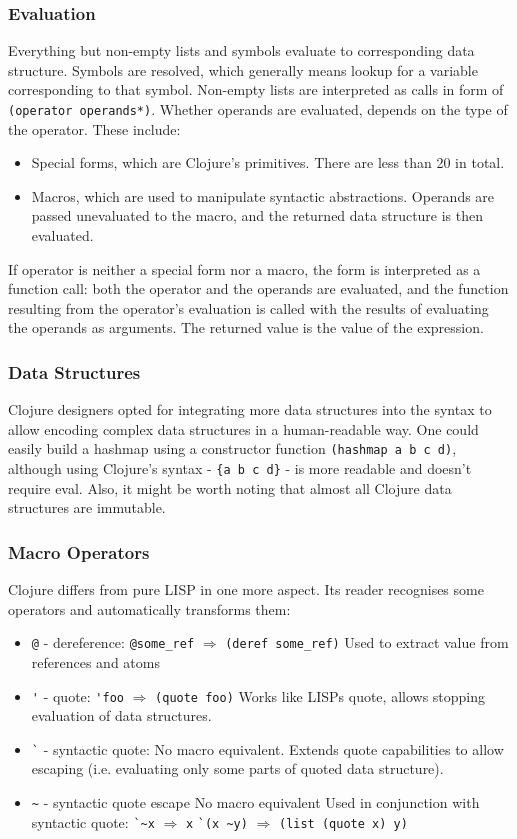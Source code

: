 \documentclass[11pt]{scrartcl}
\begin{document}
\subsubsection{Evaluation}
Everything but non-empty lists and symbols evaluate to corresponding data
structure.
Symbols are resolved, which generally means lookup for a variable corresponding
to that symbol.
Non-empty lists are interpreted as calls in form of \lstinline|(operator operands*)|.
Whether operands are evaluated, depends on the type of the operator.
These include:
\begin{itemize}
  \item Special forms, which are Clojure’s primitives. There are  less than 20
    in total.
  \item Macros, which are used to manipulate syntactic abstractions. Operands
    are passed unevaluated to the macro, and the returned data structure is then
    evaluated.
\end{itemize}
If operator is neither a special form nor a macro, the form is interpreted as a
function call: both the operator and the operands are evaluated, and the
function resulting from the operator’s evaluation is called with the results of
evaluating the operands as arguments.
The returned value is the value of the expression.

\subsubsection{Data Structures}
Clojure designers opted for integrating more data structures into the syntax to
allow encoding complex data structures in a human-readable way.
One could easily build a hashmap using a constructor function
\lstinline$(hashmap a b c d)$, although using Clojure’s syntax -
\lstinline${a b c d}$ - is more readable and doesn’t require eval.
Also, it might be worth noting that almost all Clojure data structures are
immutable.

\subsubsection{Macro Operators}
Clojure differs from pure LISP in one more aspect.
Its reader recognises some operators and automatically transforms them:
\begin{itemize}
  \item \lstinline|@| - dereference:
\lstinline|@some_ref| $\Rightarrow$ \lstinline|(deref some_ref)|
Used to extract value from references and atoms
  \item \lstinline|'| - quote:
\lstinline|'foo| $\Rightarrow$ \lstinline|(quote foo)|
Works like LISPs quote, allows stopping evaluation of data structures.
  \item \lstinline|`| - syntactic quote:
No macro equivalent.
Extends quote capabilities to allow escaping (i.e. evaluating only some parts of
quoted data structure).

  \item \lstinline|~| - syntactic quote escape
No macro equivalent
Used in conjunction with syntactic quote:
\lstinline|`~x| $\Rightarrow$ \lstinline|x|
\lstinline|`(x ~y)| $\Rightarrow$ \lstinline|(list (quote x) y)|
\end{itemize}
\end{document}
